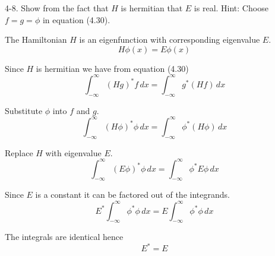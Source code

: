 \documentclass[12pt]{article}
\begin{document}
4-8.
Show from the fact that $H$ is hermitian that $E$ is real.
Hint: Choose $f=g=\phi$ in equation (4.30).

\bigskip
The Hamiltonian $H$ is an eigenfunction with corresponding eigenvalue $E$.
\begin{equation*}
H\phi(x)=E\phi(x)
\tag{4.42}
\end{equation*}

Since $H$ is hermitian we have from equation (4.30)
\begin{equation*}
\int_{-\infty}^\infty(Hg)^*f\,dx=\int_{-\infty}^\infty g^*(Hf)\,dx
\tag{4.30}
\end{equation*}

Substitute $\phi$ into $f$ and $g$.
\begin{equation*}
\int_{-\infty}^\infty(H\phi)^*\phi\,dx=\int_{-\infty}^\infty \phi^*(H\phi)\,dx
\end{equation*}

Replace $H$ with eigenvalue $E$.
\begin{equation*}
\int_{-\infty}^\infty (E\phi)^*\phi\,dx=\int_{-\infty}^\infty \phi^*E\phi\,dx
\end{equation*}

Since $E$ is a constant it can be factored out of the integrands.
\begin{equation*}
E^*\int_{-\infty}^\infty\phi^*\phi\,dx=E\int_{-\infty}^\infty \phi^*\phi\,dx
\end{equation*}

The integrals are identical hence
\begin{equation*}
E^*=E
\end{equation*}
\end{document}
